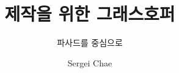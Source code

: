 \documentclass[graybox,envcountchap,sectrefs]{svmono}
\begin{document}
\author{Sergei Chae}
\title{제작을 위한 그래스호퍼}
\subtitle{파사드를 중심으로}
\maketitle

\frontmatter%






\tableofcontents




\mainmatter%







\backmatter%


\printindex

\end{document}
